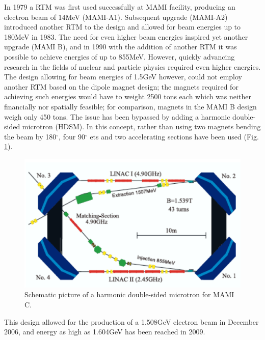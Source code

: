 In 1979 a RTM was first used successfully at MAMI facility, producing an electron beam of 14MeV (MAMI-A1). Subsequent upgrade (MAMI-A2) introduced another RTM to the design and allowed for beam energies up to 180MeV in 1983. The need for even higher beam energies inspired yet another upgrade (MAMI B), and in 1990 with the addition of another RTM it was possible to achieve energies of up to 855MeV. However, quickly advancing research in the fields of nuclear and particle physics required even higher energies. The design allowing for beam energies of 1.5GeV however, could not employ another RTM based on the dipole magnet design; the magnets required for achieving such energies would have to weight 2500 tons each which was neither financially nor spatially feasible; for comparison, magnets in the MAMI B design weigh only 450 tons. The issue has been bypassed by adding a harmonic double-sided microtron (HDSM). In this concept, rather than using two magnets bending the beam by 180$^{\circ}$, four 90$^{\circ}$ ets and two accelerating sections have been used (Fig. \ref{mamic}). 

\begin{figure}[H]
\begin{center}
\includegraphics[scale=0.25]{HDSM.png}
\caption{Schematic picture of a harmonic double-sided microtron for MAMI C.}
\label{mamic}
\end{center}
\end{figure}

This design allowed for the production of a 1.508GeV electron beam in December 2006, and energy as high as 1.604GeV has been reached in 2009.

